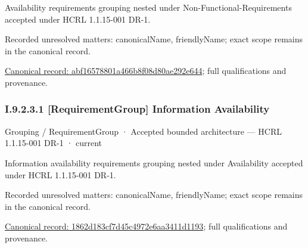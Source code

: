 Availability requirements grouping nested under Non-Functional-Requirements accepted under HCRL 1.1.15-001 DR-1.


{\small Recorded unresolved matters: canonicalName, friendlyName; exact scope remains in the canonical record.}\par
{\footnotesize \href{../../../../continuum/grouping/requirement-group/abf16578801a466b8f08d80ae292e644.md}{Canonical record: abf16578801a466b8f08d80ae292e644}; full qualifications and provenance.}\par
\subsubsection*{I.9.2.3.1 [RequirementGroup] Information Availability}
\label{navigation:I.9.2.3.1}

\label{element:1862d183cf7d45c4972e6aa3411d1193}
{\small Grouping / RequirementGroup · Accepted bounded architecture — HCRL 1.1.15-001 DR-1 · current}\par

Information availability requirements grouping nested under Availability accepted under HCRL 1.1.15-001 DR-1.


{\small Recorded unresolved matters: canonicalName, friendlyName; exact scope remains in the canonical record.}\par
{\footnotesize \href{../../../../continuum/grouping/requirement-group/1862d183cf7d45c4972e6aa3411d1193.md}{Canonical record: 1862d183cf7d45c4972e6aa3411d1193}; full qualifications and provenance.}\par
